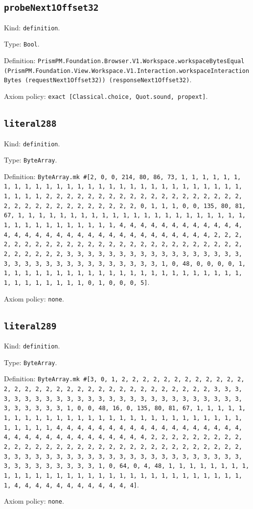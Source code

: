 \documentclass[11pt]{article}
\begin{document}
\subsection*{\texttt{probeNext1Offset32}}
\noindent Kind: \texttt{definition}.\par
\noindent Type: \texttt{Bool}.\par
\noindent Definition: \texttt{PrismPM.Foundation.Browser.V1.Workspace.workspaceBytesEqual (PrismPM.Foundation.View.Workspace.V1.Interaction.workspaceInteractionBytes (requestNext1Offset32)) (responseNext1Offset32)}.\par
\noindent Axiom policy: \texttt{exact [Classical.choice, Quot.sound, propext]}.\par
\subsection*{\texttt{literal288}}
\noindent Kind: \texttt{definition}.\par
\noindent Type: \texttt{ByteArray}.\par
\noindent Definition: \texttt{ByteArray.mk \#[2, 0, 0, 214, 80, 86, 73, 1, 1, 1, 1, 1, 1, 1, 1, 1, 1, 1, 1, 1, 1, 1, 1, 1, 1, 1, 1, 1, 1, 1, 1, 1, 1, 1, 1, 1, 1, 1, 1, 1, 2, 2, 2, 2, 2, 2, 2, 2, 2, 2, 2, 2, 2, 2, 2, 2, 2, 2, 2, 2, 2, 2, 2, 2, 2, 2, 2, 2, 2, 2, 2, 2, 0, 1, 1, 1, 0, 0, 135, 80, 81, 67, 1, 1, 1, 1, 1, 1, 1, 1, 1, 1, 1, 1, 1, 1, 1, 1, 1, 1, 1, 1, 1, 1, 1, 1, 1, 1, 1, 1, 1, 1, 1, 1, 1, 4, 4, 4, 4, 4, 4, 4, 4, 4, 4, 4, 4, 4, 4, 4, 4, 4, 4, 4, 4, 4, 4, 4, 4, 4, 4, 4, 4, 4, 4, 4, 4, 2, 2, 2, 2, 2, 2, 2, 2, 2, 2, 2, 2, 2, 2, 2, 2, 2, 2, 2, 2, 2, 2, 2, 2, 2, 2, 2, 2, 2, 2, 2, 2, 3, 3, 3, 3, 3, 3, 3, 3, 3, 3, 3, 3, 3, 3, 3, 3, 3, 3, 3, 3, 3, 3, 3, 3, 3, 3, 3, 3, 3, 3, 3, 3, 1, 0, 48, 0, 0, 0, 0, 1, 1, 1, 1, 1, 1, 1, 1, 1, 1, 1, 1, 1, 1, 1, 1, 1, 1, 1, 1, 1, 1, 1, 1, 1, 1, 1, 1, 1, 1, 1, 1, 0, 1, 0, 0, 0, 5]}.\par
\noindent Axiom policy: \texttt{none}.\par
\subsection*{\texttt{literal289}}
\noindent Kind: \texttt{definition}.\par
\noindent Type: \texttt{ByteArray}.\par
\noindent Definition: \texttt{ByteArray.mk \#[3, 0, 1, 2, 2, 2, 2, 2, 2, 2, 2, 2, 2, 2, 2, 2, 2, 2, 2, 2, 2, 2, 2, 2, 2, 2, 2, 2, 2, 2, 2, 2, 2, 2, 2, 3, 3, 3, 3, 3, 3, 3, 3, 3, 3, 3, 3, 3, 3, 3, 3, 3, 3, 3, 3, 3, 3, 3, 3, 3, 3, 3, 3, 3, 3, 3, 3, 1, 0, 0, 48, 16, 0, 135, 80, 81, 67, 1, 1, 1, 1, 1, 1, 1, 1, 1, 1, 1, 1, 1, 1, 1, 1, 1, 1, 1, 1, 1, 1, 1, 1, 1, 1, 1, 1, 1, 1, 1, 1, 1, 4, 4, 4, 4, 4, 4, 4, 4, 4, 4, 4, 4, 4, 4, 4, 4, 4, 4, 4, 4, 4, 4, 4, 4, 4, 4, 4, 4, 4, 4, 4, 4, 2, 2, 2, 2, 2, 2, 2, 2, 2, 2, 2, 2, 2, 2, 2, 2, 2, 2, 2, 2, 2, 2, 2, 2, 2, 2, 2, 2, 2, 2, 2, 2, 3, 3, 3, 3, 3, 3, 3, 3, 3, 3, 3, 3, 3, 3, 3, 3, 3, 3, 3, 3, 3, 3, 3, 3, 3, 3, 3, 3, 3, 3, 3, 3, 1, 0, 64, 0, 4, 48, 1, 1, 1, 1, 1, 1, 1, 1, 1, 1, 1, 1, 1, 1, 1, 1, 1, 1, 1, 1, 1, 1, 1, 1, 1, 1, 1, 1, 1, 1, 1, 1, 4, 4, 4, 4, 4, 4, 4, 4, 4, 4, 4, 4]}.\par
\noindent Axiom policy: \texttt{none}.\par
\end{document}
